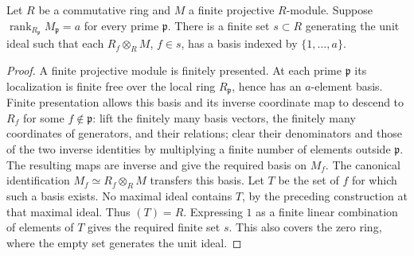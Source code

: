 \begin{lemma}
\label{lem:finite-projective-frames}
\leanok
Let $R$ be a commutative ring and $M$ a finite projective $R$-module.
Suppose $\operatorname{rank}_{R_{\mathfrak p}}M_{\mathfrak p}=a$
for every prime $\mathfrak p$. There is a finite set $s\subset R$
generating the unit ideal such that each $R_f\otimes_R M$, $f\in s$,
has a basis indexed by $\{1,\ldots,a\}$.
\end{lemma}
\begin{proof}
A finite projective module is finitely presented. At each prime
$\mathfrak p$ its localization is finite free over the local ring
$R_{\mathfrak p}$, hence has an $a$-element basis. Finite presentation
allows this basis and its inverse coordinate map to descend to
$R_f$ for some $f\notin\mathfrak p$: lift the finitely many basis
vectors, the finitely many coordinates of generators, and their
relations; clear their denominators and those of the two inverse
identities by multiplying a finite number of elements outside
$\mathfrak p$. The resulting maps are inverse and give the required
basis on $M_f$. The canonical identification
$M_f\simeq R_f\otimes_R M$ transfers this basis.
Let $T$ be the set of $f$ for which such a basis exists. No maximal
ideal contains $T$, by the preceding construction at that maximal
ideal. Thus $(T)=R$. Expressing $1$ as a finite linear combination
of elements of $T$ gives the required finite set $s$. This also
covers the zero ring, where the empty set generates the unit ideal.
\end{proof}

